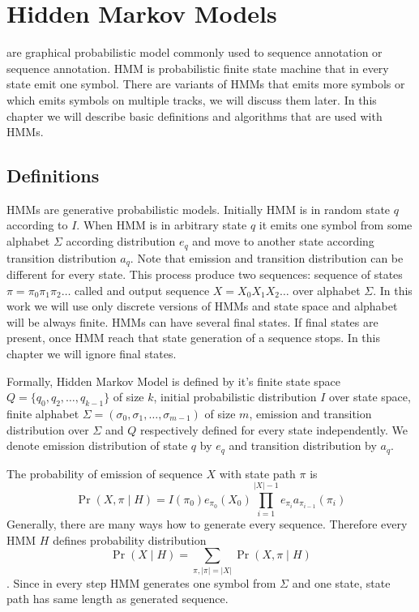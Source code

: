 \chapter{Hidden Markov Models}

 are graphical probabilistic model
commonly used to sequence annotation or sequence annotation. HMM is
probabilistic finite state machine that in every state emit one symbol. There
are variants of HMMs that emits more symbols or which emits symbols on multiple
tracks, we will discuss them later. In this chapter we will describe basic
definitions and algorithms that are used with HMMs.

\section{Definitions}
                       
HMMs are generative probabilistic models. Initially HMM is in random state $q$
according to  $I$.  When HMM is in arbitrary
state $q$ it emits one symbol from some alphabet $\Sigma$ according distribution
$e_q$ and move to another state according transition distribution $a_q$. Note
that emission and transition distribution can be different for every state.
This process produce two sequences: sequence of states
$\pi=\pi_0\pi_1\pi_2\dots$ called  and output sequence
$X=X_0X_1X_2\dots$ over alphabet $\Sigma$. In this work we will use only
discrete versions of HMMs and state space and alphabet will be always finite.
HMMs can have several final states. If final states are present, once HMM reach
that state generation of a sequence stops. In this chapter we will ignore final
states. 

Formally, Hidden Markov Model is defined by it's finite state space
$Q=\{q_0,q_2,\dots, q_{k-1}\}$ of size $k$, initial probabilistic distribution
$I$ over state space, finite alphabet $\Sigma = (\sigma_0, \sigma_1, \dots,
\sigma_{m-1})$ of
size $m$, emission and transition distribution over $\Sigma$ and $Q$
respectively defined for every state independently. We denote emission
distribution of state $q$ by $e_q$ and transition distribution by $a_{q}$. 


The probability of emission of sequence $X$ with state path $\pi$
is \[\Pr\left(X,\pi\mid H\right) =
I(\pi_0)e_{\pi_0}\left(X_0\right)\prod_{i=1}^{|X|-1}e_{\pi_i}a_{\pi_{i-1}}\left(\pi_i\right)\]
Generally, there are many ways how to generate every sequence.  Therefore every
HMM $H$ defines probability distribution \[\Pr\left(X\mid H\right) =
\sum_{\pi,|\pi|=|X|}\Pr\left(X,\pi\mid H\right)\].  Since in every step HMM
generates one symbol from $\Sigma$ and one state, state path has same length as
generated sequence.

